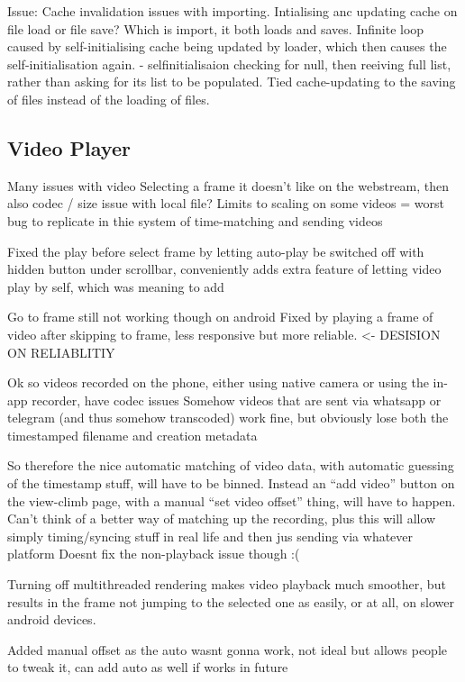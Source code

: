 Issue: Cache invalidation issues with importing. Intialising anc updating cache on file load or file save? Which is import, it both loads and saves.
Infinite loop caused by self-initialising cache being updated by loader, which then causes the self-initialisation again. - selfinitialisaion checking for null, then reeiving full list, rather than asking for its list to be populated. Tied cache-updating to the saving of files instead of the loading of files.




\subsection{Video Player}

Many issues with video
Selecting a frame it doesn’t like on the webstream, then also codec / size issue with local file?
Limits to scaling on some videos = worst bug to replicate in thie system of time-matching and sending videos

Fixed the play before select frame by letting auto-play be switched off with hidden button under scrollbar, conveniently adds extra feature of letting video play by self, which was meaning to add

Go to frame still not working though on android
Fixed by playing a frame of video after skipping to frame, less responsive but more reliable. <- DESISION ON RELIABLITIY




Ok so videos recorded on the phone, either using native camera or using the in-app recorder, have codec issues
Somehow videos that are sent via whatsapp or telegram (and thus somehow transcoded) work fine, but obviously lose both the timestamped filename and creation metadata


So therefore the nice automatic matching of video data, with automatic guessing of the timestamp stuff, will have to be binned.
Instead an “add video” button on the view-climb page, with a manual “set video offset” thing, will have to happen.
Can’t think of a better way of matching up the recording, plus this will allow simply timing/syncing stuff in real life and then jus sending via whatever platform
Doesnt fix the non-playback issue though :(

Turning off multithreaded rendering makes video playback much smoother, but results in the frame not jumping to the selected one as easily, or at all, on slower android devices.


Added manual offset as the auto wasnt gonna work, not ideal but allows people to tweak it, can add auto as well if works in future








